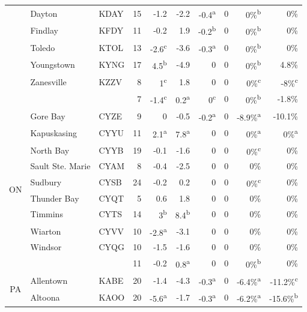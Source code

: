 \documentclass[twocol]{ametsoc}
\begin{document}
\begin{landscape}
\begin{table}[]
\begin{tabular}{@{}cllrrrrrrr@{}}
 & Dayton & KDAY & 15 & -1.2 & -2.2 & -0.4\textsuperscript{a} & 0 & 0\%\textsuperscript{b} & 0\% \\
 & Findlay & KFDY & 11 & -0.2 & 1.9 & -0.2\textsuperscript{b} & 0 & 0\%\textsuperscript{b} & 0\% \\
 & Toledo & KTOL & 13 & -2.6\textsuperscript{c} & -3.6 & -0.3\textsuperscript{a} & 0 & 0\%\textsuperscript{b} & 0\% \\
 & Youngstown & KYNG & 17 & 4.5\textsuperscript{b} & -4.9 & 0 & 0 & 0\%\textsuperscript{b} & 4.8\% \\
 & Zanesville & KZZV & 8 & 1\textsuperscript{c} & 1.8 & 0 & 0 & 0\%\textsuperscript{c} & -8\%\textsuperscript{c} \\ \cmidrule(l){2-10} 
 &  &  & 7 & -1.4\textsuperscript{c} & 0.2\textsuperscript{a} & 0\textsuperscript{c} & 0 & 0\%\textsuperscript{b} & -1.8\% \\ \midrule
\multirow{10}{*}{ON} & Gore Bay & CYZE & 9 & 0 & -0.5 & -0.2\textsuperscript{a} & 0 & -8.9\%\textsuperscript{a} & -10.1\% \\
 & Kapuskasing & CYYU & 11 & 2.1\textsuperscript{a} & 7.8\textsuperscript{a} & 0 & 0 & 0\%\textsuperscript{a} & 0\%\textsuperscript{a} \\
 & North Bay & CYYB & 19 & -0.1 & -1.6 & 0 & 0 & 0\%\textsuperscript{c} & 0\% \\
 & Sault Ste. Marie & CYAM & 8 & -0.4 & -2.5 & 0 & 0 & 0\% & 0\% \\
 & Sudbury & CYSB & 24 & -0.2 & 0.2 & 0 & 0 & 0\%\textsuperscript{c} & 0\% \\
 & Thunder Bay & CYQT & 5 & 0.6 & 1.8 & 0 & 0 & 0\% & 0\% \\
 & Timmins & CYTS & 14 & 3\textsuperscript{b} & 8.4\textsuperscript{b} & 0 & 0 & 0\% & 0\% \\
 & Wiarton & CYVV & 10 & -2.8\textsuperscript{a} & -3.1 & 0 & 0 & 0\% & 0\% \\
 & Windsor & CYQG & 10 & -1.5 & -1.6 & 0 & 0 & 0\% & 0\% \\ \cmidrule(l){2-10} 
 &  &  & 11 & -0.2 & 0.8\textsuperscript{a} & 0 & 0 & 0\%\textsuperscript{b} & 0\% \\ \midrule
\multirow{10}{*}{PA} & Allentown & KABE & 20 & -1.4 & -4.3 & -0.3\textsuperscript{a} & 0 & -6.4\%\textsuperscript{a} & -11.2\%\textsuperscript{c} \\
 & Altoona & KAOO & 20 & -5.6\textsuperscript{a} & -1.7 & -0.3\textsuperscript{a} & 0 & -6.2\%\textsuperscript{a} & -15.6\%\textsuperscript{b} \\

\end{tabular}
\end{table}
\end{landscape}
\end{document}

